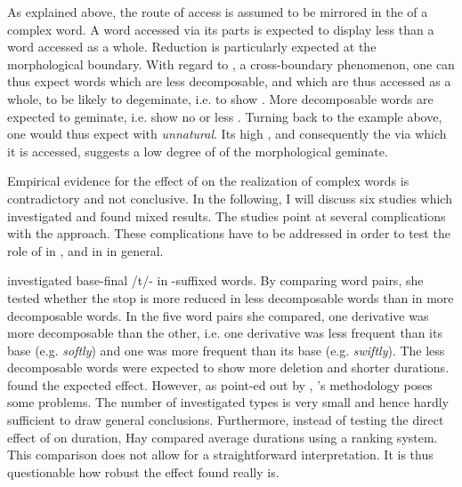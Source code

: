 As explained above, the route of access is assumed to be mirrored in the  of a complex word. A word accessed via its parts is expected to display less  than a word accessed as a whole. Reduction is particularly expected at the morphological boundary. With regard to , a cross-boundary phenomenon, one can thus expect words which are less decomposable, and which are thus accessed as a whole, to be likely to degeminate, i.e. to show . More decomposable words are expected to geminate, i.e. show no or less . 
Turning back to the example above, one would thus expect  with \textit{unnatural}. Its high , and consequently the  via which it is accessed, suggests a low degree of  of the morphological geminate.


Empirical evidence for the effect of  on the realization of complex words is contradictory and not conclusive. In the following, I will discuss six studies which investigated  and found mixed results. The studies point at several complications with the approach. These complications have to be addressed in order to test the role of  in , and in  in general. 

 \cite{Hay.2003} investigated  base-final /t/- in -suffixed words. By comparing word pairs, she tested whether the stop is more reduced in less decomposable words than in more decomposable words. In the five word pairs she compared, one derivative was more decomposable than the other, i.e. one derivative was less frequent than its base (e.g. \textit{softly}) and one was more frequent than its base (e.g. \textit{swiftly}). The less decomposable words were expected to show more deletion and shorter durations.  \citeauthor{Hay.2003} found the expected effect. 
 However, as point-ed out by \cite{Hanique.2012}, \citeauthor{Hay.2003}'s methodology poses some problems. The number of investigated types is very small and hence hardly sufficient to draw general conclusions. Furthermore, instead of testing the direct effect of  on duration, Hay compared average durations using a ranking system. This comparison does not allow for a straightforward interpretation. It is thus questionable how robust the effect found really is.

